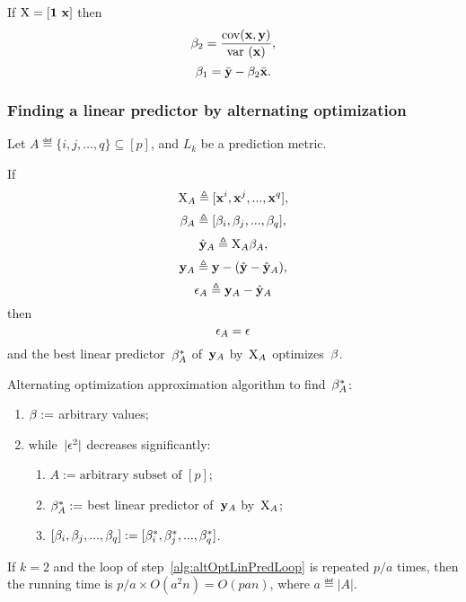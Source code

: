 \documentclass[10pt,a4paper]{article}
\theoremstyle{plain} \newtheorem{Lem}{Lemma}
\begin{document}
If $\mathrm X = [\mathbf 1 \ \mathbf x]$ then
$$ \beta_2 = \frac {\mathrm {cov} (\mathbf x, \mathbf y)} {\mathrm {var} \  (\mathbf x)}, $$
$$ \beta_1 = \bar {\mathbf y} - \beta_2 \bar {\mathbf x}. $$


\subsubsection {Finding a linear predictor by alternating optimization}

Let $A \eqdef \{i,j,\dots,q\} \subseteq [p]$,
and $L_k$ be a prediction metric.

If 
$$ \mathrm X_A \triangleq [\mathbf x^i, \mathbf x^j, ..., \mathbf x^q], $$
$$ \mathbf \beta_A \triangleq [\mathbf \beta_i, \mathbf \beta_j, ..., \mathbf \beta_q], $$
$$ \hat {\mathbf y}_A \triangleq \mathrm X_A \mathbf \beta_A, $$
$$ \mathbf y_A \triangleq \mathbf y - (\hat {\mathbf y} - \hat {\mathbf y}_A), $$
$$ \mathbf \epsilon_A \triangleq \mathbf y_A - \hat {\mathbf y}_A $$
then
$$ \mathbf \epsilon_A = \mathbf \epsilon $$
and the best linear predictor~$\mathbf \beta^*_A$ of~$\mathbf y_A$ by~$\mathrm X_A$ optimizes~$\mathbf \beta$.

Alternating optimization approximation algorithm to find~$\mathbf \beta^*_A$:
\begin{enumerate}
  \item $\mathbf \beta := $ arbitrary values;
  \item while~$|\mathbf \epsilon^2|$ decreases significantly:
    \label{alg:altOptLinPredLoop}
    \begin{enumerate}
        \item $A := \textrm {arbitrary subset of } [p]$;
        \item $\mathbf \beta^*_A :=$ best linear predictor of~$\mathbf y_A$ by~$\mathrm X_A$;
        \item $[\mathbf \beta_i, \mathbf \beta_j, ..., \mathbf \beta_q] := [\mathbf \beta^*_i, \mathbf \beta^*_j, ..., \mathbf \beta^*_q]$.
    \end{enumerate}
\end{enumerate}

If $k = 2$ and the loop of step~\ref{alg:altOptLinPredLoop} is repeated $p/a$ times, then the running time is $p/a \times O(a^2 n) = O(pan)$,
where $a \eqdef |A|$.


\vspace {5mm}


\end{document}
